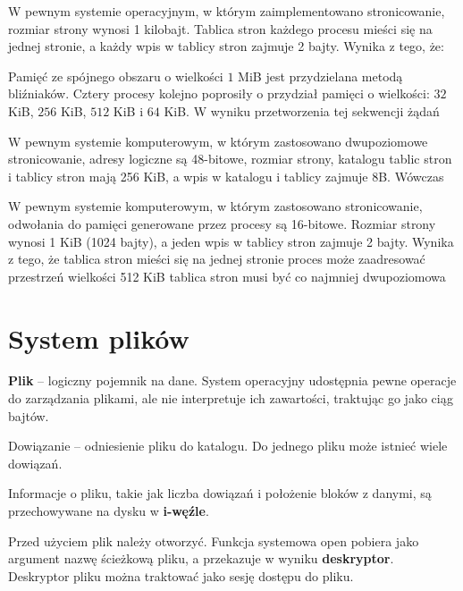 \begin{problems}
    \prob W pewnym systemie operacyjnym, w którym zaimplementowano stronicowanie, rozmiar strony wynosi 1 kilobajt. Tablica stron każdego procesu mieści się na jednej stronie, a każdy wpis w tablicy stron zajmuje 2 bajty. Wynika z tego, że:

    \prob Pamięć ze spójnego obszaru o wielkości $1$ MiB jest przydzielana metodą bliźniaków. Cztery procesy kolejno poprosiły o przydział pamięci o wielkości: $32$ KiB, $256$ KiB, $512$ KiB i $64$ KiB. W wyniku przetworzenia tej sekwencji żądań

    \prob W pewnym systemie komputerowym, w którym zastosowano dwupoziomowe stronicowanie, adresy logiczne są 48-bitowe, rozmiar strony, katalogu tablic stron i tablicy stron mają 256 KiB, a wpis w katalogu i tablicy zajmuje 8B. Wówczas
    
    \prob W pewnym systemie komputerowym, w którym zastosowano stronicowanie, odwołania do pamięci generowane przez procesy są 16-bitowe. Rozmiar strony wynosi 1 KiB (1024 bajty), a jeden wpis w tablicy stron zajmuje 2 bajty. Wynika z tego, że
    \answers
    {tablica stron mieści się na jednej stronie}
    {proces może zaadresować przestrzeń wielkości 512 KiB}
    {tablica stron musi być co najmniej dwupoziomowa}
\end{problems}

\section{System plików}

\textbf{Plik} -- logiczny pojemnik na dane. System operacyjny udostępnia pewne operacje do zarządzania plikami, ale nie interpretuje ich zawartości, traktując go jako ciąg bajtów.

Dowiązanie -- odniesienie pliku do katalogu. Do jednego pliku może istnieć wiele dowiązań.

Informacje o pliku, takie jak liczba dowiązań i położenie bloków z danymi, są przechowywane na dysku w \textbf{i-węźle}.

Przed użyciem plik należy otworzyć. Funkcja systemowa open pobiera jako argument nazwę ścieżkową pliku, a przekazuje w wyniku \textbf{deskryptor}.
Deskryptor pliku można traktować jako sesję dostępu do pliku. 

